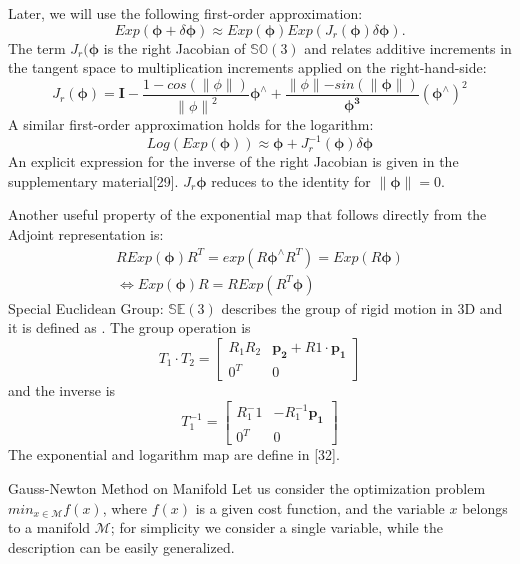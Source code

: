 \documentclass[a4paper,12pt]{report}
\begin{document}
Later, we will use the following first-order approximation:
\begin{equation}
Exp(\bm{\phi}+\delta \bm{\phi})\approx Exp(\bm{\phi})Exp(J_r(\bm{\phi}) \delta \bm{\phi}).
\end{equation}
The term $J_r(\bm{\phi}$ is the right Jacobian of $\mathbb{SO}(3)$ and relates additive increments in the tangent space to multiplication increments applied on the right-hand-side:
\begin{equation}
J_r({\bm{\phi}})=\bm{I}-\frac{1-cos(\parallel \phi \parallel)}{{\parallel \phi \parallel}^2}\bm{\phi^{\land}}+\frac{\parallel \phi \parallel - sin(\parallel \bm{\phi} \parallel)}{\bm{\phi^{3}}}(\bm{\phi}^{\land})^2
\end{equation}
A similar first-order approximation holds for the logarithm:
\begin{equation}
Log(Exp(\bm{\phi}))\approx \bm{\phi}+J_r^{-1}(\bm{\phi})\delta \bm{\phi}
\end{equation}
An explicit expression for the inverse of the right Jacobian is given in the supplementary material[29]. $J_r{\bm{\phi}}$ reduces to the identity for $\parallel \bm{\phi} \parallel=0$.

Another useful property of the exponential map that follows directly from the Adjoint representation is:
\begin{eqnarray}
R Exp(\bm{\phi}) R^T = exp(R\bm{\phi}^{\land}R^T)=Exp(R\bm{\phi}) \\ 
\iff Exp(\bm{\phi})R=RExp(R^T\bm{\phi})
\end{eqnarray}
Special Euclidean Group: $\mathbb{SE}(3)$ describes the group of rigid motion in 3D and it is defined as . The group operation is 
$$
T_1 \cdot T_2=
\left[
\begin{matrix}
R_1R_2 & \bm{p_2}+R1\cdot \bm{p_1} \\
0^T & 0
\end{matrix}
\right]
$$
and the inverse is 
$$
T_1^{-1}=\left[
\begin{matrix}
R_1^-1 & -R_1^{-1}\bm{p_1} \\
0^T & 0
\end{matrix}
\right]
$$
The exponential and logarithm map are define in [32]. 




Gauss-Newton Method on Manifold
Let us consider the optimization problem $min_{x \in \mathcal{M}}{f(x)}$, where $f(x)$ is a given cost function, and the variable $x$ belongs to a manifold $\mathcal{M}$; for simplicity we consider a single variable, while the description can be easily generalized.
\end{document}
